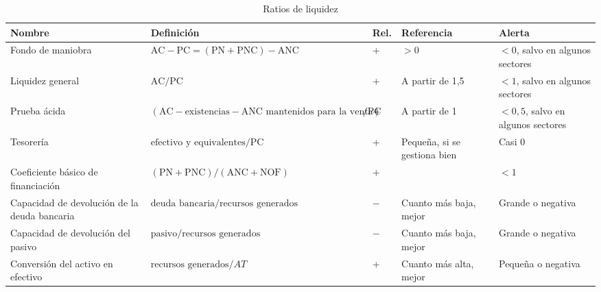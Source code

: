 \documentclass[11pt]{article}
\begin{document}
\begin{table}[H]
\centering
\caption{Ratios de liquidez}\label{tab:ratios-liquidez}
\footnotesize
\renewcommand{\arraystretch}{1.3}
\begin{tabular}{>{\raggedright\arraybackslash}m{3.1cm}>{\centering\arraybackslash}m{5.4cm}>{\centering\arraybackslash}m{0.9cm}>{\centering\arraybackslash}m{2.1cm}>{\centering\arraybackslash}m{2.4cm}}
\toprule
\rowcolor{tceeazulpalido}\textbf{Nombre} & \textbf{Definición} & \textbf{Rel.} & \textbf{Referencia} & \textbf{Alerta} \\
\midrule
Fondo de maniobra & $\mathrm{AC}-\mathrm{PC}=(\mathrm{PN}+\mathrm{PNC})-\mathrm{ANC}$ & + & $>0$ & $<0$, salvo en algunos sectores \\
Liquidez general & $\mathrm{AC}/\mathrm{PC}$ & + & A partir de 1,5 & $<1$, salvo en algunos sectores \\
Prueba ácida & $(\mathrm{AC}-\text{existencias}-\text{ANC mantenidos para la venta})/\allowbreak \mathrm{PC}$ & + & A partir de 1 & $<0{,}5$, salvo en algunos sectores \\
Tesorería & $\text{efectivo y equivalentes}/\allowbreak \mathrm{PC}$ & + & Pequeña, si se gestiona bien & Casi 0 \\
Coeficiente básico de financiación & $(\mathrm{PN}+\mathrm{PNC})/(\mathrm{ANC}+\mathrm{NOF})$ & + & 1 & $<1$ \\
Capacidad de devolución de la deuda bancaria & $\text{deuda bancaria}/\allowbreak \text{recursos generados}$ & $-$ & Cuanto más baja, mejor & Grande o negativa \\
Capacidad de devolución del pasivo & $\text{pasivo}/\allowbreak \text{recursos generados}$ & $-$ & Cuanto más baja, mejor & Grande o negativa \\
Conversión del activo en efectivo & $\text{recursos generados}/\allowbreak AT$ & + & Cuanto más alta, mejor & Pequeña o negativa \\
\bottomrule
\end{tabular}
\end{table}
\end{document}

